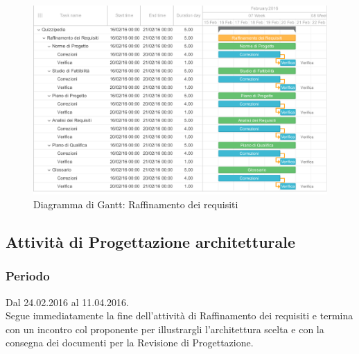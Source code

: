 \documentclass[a4paper, titlepage]{article}
\begin{document}
	\newpage
	\begin{figure}
		\includegraphics[scale=0.7]{Img/Grafici_Gantt/Raffinamento_requisiti.pdf}
		\caption{ Diagramma di Gantt: Raffinamento dei requisiti}
	\end{figure}
	
	\subsection{Attività di Progettazione architetturale}
	\subsubsection{Periodo}
	Dal 24.02.2016 al 11.04.2016.\\
	Segue immediatamente la fine dell'attività di Raffinamento dei requisiti  e termina con un incontro col proponente per illustrargli l'architettura scelta e con la consegna dei documenti per la Revisione di Progettazione.
	
\end{document}
